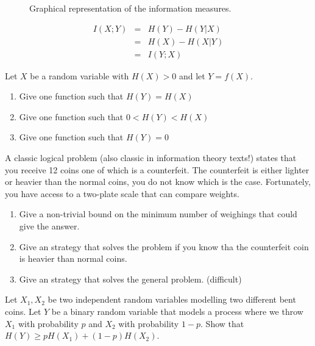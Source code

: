 \begin{figure}
\begin{center}
\def\svgwidth{.8\columnwidth} 
 
\caption{Graphical representation of the information measures.}
\label{fig:infmeasures}
\end{center}
\end{figure}

\begin{eqnarray}
\label{eq:mutualinformation}
I({X};{Y}) &=& H({Y}) - H({Y}|{X}) \nonumber\\
         &=& H({X}) - H({X}|{Y}) \nonumber\\
         &=& I({Y};{X})
\end{eqnarray}
\begin{exercise}
Let $X$ be a random variable with $H(X)>0$ and let $Y=f(X)$. 
\begin{enumerate}
\item Give one function such that $H(Y)=H(X)$
\item Give one function such that $0<H(Y)<H(X)$
\item Give one function such that $H(Y)=0$
\end{enumerate}
\end{exercise}
\begin{exercise}
A classic logical problem (also classic in information theory texts!) states that you receive 12 coins one of which is a counterfeit. The counterfeit is either lighter or heavier than the normal coins, you do not know which is the case. Fortunately, you have access to a two-plate scale that can compare weights.
\begin{enumerate}
\item Give a non-trivial bound on the minimum number of weighings that could give the answer.
\item Give an strategy that solves the problem if you know tha the counterfeit coin is heavier than normal coins.
\item Give an strategy that solves the general problem. (difficult)
\end{enumerate}
\end{exercise}
\begin{exercise}
Let $X_1,X_2$ be two independent random variables modelling two different bent coins. 
Let $Y$ be a binary random variable that models a process where we throw $X_1$ with probability $p$ and $X_2$ with probability $1-p$. 
Show that $H(Y)\geq pH(X_1)+(1-p)H(X_2)$.
\end{exercise}
